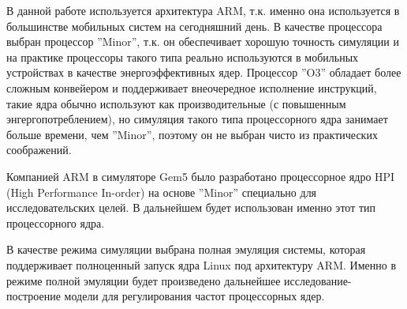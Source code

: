     В данной работе используется архитектура ARM, т.к. именно она используется в большинстве мобильных
    систем на сегодняшний день. В качестве процессора выбран процессор ''Minor'', т.к. он обеспечивает
    хорошую точность симуляции и на практике процессоры такого типа реально используются в мобильных
    устройствах в качестве энергоэффективных ядер. Процессор ''O3'' обладает более сложным конвейером и
    поддерживает внеочередное исполнение инструкций, такие ядра обычно используют как производительные
    (с повышенным энгергопотреблением), но симуляция такого типа процессорного ядра занимает больше
    времени, чем ''Minor'', поэтому он не выбран чисто из практических соображений.

    Компанией ARM в симуляторе Gem5 было разработано процессорное ядро HPI (High Performance In-order)
    \cite{gem52017HPI} на основе ''Minor'' специально для исследовательских целей. В дальнейшем
    будет использован именно этот тип процессорного ядра.

    В качестве режима симуляции выбрана полная эмуляция системы, которая поддерживает полноценный запуск
    ядра Linux под архитектуру ARM. Именно в режиме полной эмуляции будет произведено дальнейшее
    исследование-построение модели для регулирования частот процессорных ядер.


\newpage
